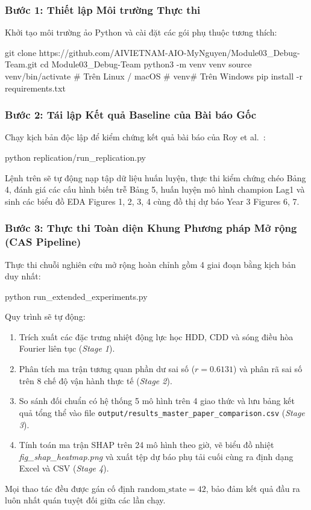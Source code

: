 \subsubsection{Bước 1: Thiết lập Môi trường Thực thi}
Khởi tạo môi trường ảo Python và cài đặt các gói phụ thuộc tương thích:
\begin{aivnoutputbox}
git clone https://github.com/AIVIETNAM-AIO-MyNguyen/Module03_Debug-Team.git
cd Module03_Debug-Team
python3 -m venv venv
source venv/bin/activate        # Trên Linux / macOS
# venv\Scripts\activate         # Trên Windows
pip install -r requirements.txt
\end{aivnoutputbox}

\subsubsection{Bước 2: Tái lập Kết quả Baseline của Bài báo Gốc}
Chạy kịch bản độc lập để kiểm chứng kết quả bài báo của Roy et al.~\cite{roy2025hourly}:
\begin{aivnoutputbox}
python replication/run_replication.py
\end{aivnoutputbox}
Lệnh trên sẽ tự động nạp tập dữ liệu huấn luyện, thực thi kiểm chứng chéo Bảng 4, đánh giá các cấu hình biến trễ Bảng 5, huấn luyện mô hình champion Lag1 và sinh các biểu đồ EDA Figures 1, 2, 3, 4 cùng đồ thị dự báo Year 3 Figures 6, 7.

\subsubsection{Bước 3: Thực thi Toàn diện Khung Phương pháp Mở rộng (CAS Pipeline)}
Thực thi chuỗi nghiên cứu mở rộng hoàn chỉnh gồm 4 giai đoạn bằng kịch bản duy nhất:
\begin{aivnoutputbox}
python run_extended_experiments.py
\end{aivnoutputbox}
Quy trình sẽ tự động:
\begin{enumerate}
    \item Trích xuất các đặc trưng nhiệt động lực học HDD, CDD và sóng điều hòa Fourier liên tục (\textit{Stage 1}).
    \item Phân tích ma trận tương quan phần dư sai số ($r = 0.6131$) và phân rã sai số trên 8 chế độ vận hành thực tế (\textit{Stage 2}).
    \item So sánh đối chuẩn có hệ thống 5 mô hình trên 4 giao thức và lưu bảng kết quả tổng thể vào file \texttt{output/results\_master\_paper\_comparison.csv} (\textit{Stage 3}).
    \item Tính toán ma trận SHAP trên 24 mô hình theo giờ, vẽ biểu đồ nhiệt \textit{fig\_shap\_heatmap.png} và xuất tệp dự báo phụ tải cuối cùng ra định dạng Excel và CSV (\textit{Stage 4}).
\end{enumerate}

Mọi thao tác đều được gán cố định $\text{random\_state} = 42$, bảo đảm kết quả đầu ra luôn nhất quán tuyệt đối giữa các lần chạy.
